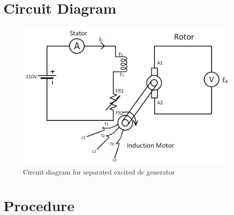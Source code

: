 \section{Circuit Diagram}
\begin{figure}[hbt!]
\vspace{00mm}
    \centerline{\includegraphics[width=1\textwidth]{Figures/Exp02/circuit diagram.jpeg}}
    \vspace{0mm}
    \caption{Circuit diagram for separated excited dc generator}
    \label{fig:figg2}
\end{figure}


\section{Procedure}


